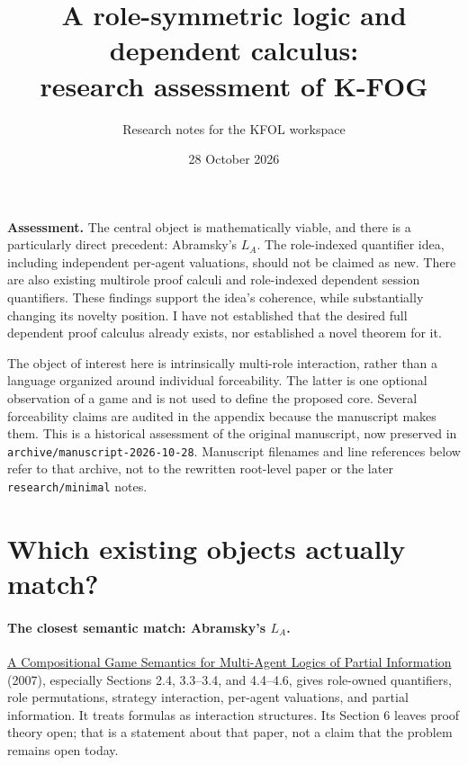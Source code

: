 \documentclass[11pt]{article}
\title{A role-symmetric logic and dependent calculus:\\research assessment of K-FOG}
\author{Research notes for the KFOL workspace}
\date{28 October 2026}
\begin{document}
\maketitle

\noindent\textbf{Assessment.}
The central object is mathematically viable, and there is a particularly direct
precedent: Abramsky's $L_A$. The role-indexed quantifier idea, including independent
per-agent valuations, should not be claimed as new. There are also existing
multirole proof calculi and role-indexed dependent session quantifiers. These
findings support the idea's coherence, while substantially changing its novelty
position. I have not established that the desired full dependent proof calculus
already exists, nor established a novel theorem for it.

The object of interest here is intrinsically multi-role interaction, rather than
a language organized around individual forceability. The latter is one optional
observation of a game and is not used to define the proposed core. Several
forceability claims are audited in the appendix because the manuscript makes them.
This is a historical assessment of the original manuscript, now preserved
in \texttt{archive/manuscript-2026-10-28}. Manuscript filenames and line
references below refer to that archive, not to the rewritten root-level
paper or the later \texttt{research/minimal} notes.

\section{Which existing objects actually match?}

\paragraph{The closest semantic match: Abramsky's $L_A$.}
\href{https://www.cs.ox.ac.uk/people/samson.abramsky/admproc.pdf}{A Compositional Game
Semantics for Multi-Agent Logics of Partial Information} (2007), especially
Sections 2.4, 3.3--3.4, and 4.4--4.6, gives role-owned quantifiers, role
permutations, strategy interaction, per-agent valuations, and partial information.
It treats formulas as interaction structures. Its Section 6 leaves proof theory
open; that is a statement about that paper, not a claim that the problem remains
open today.
\end{document}
